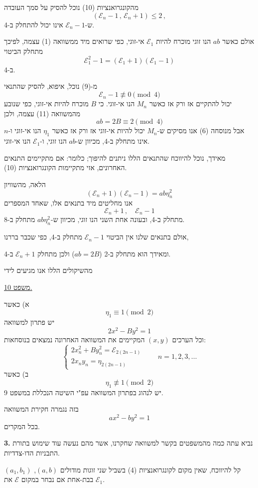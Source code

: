 \medskip
\noindent מהקונגרואנציות (10) נוכל להסיק על סמך העובדה
\[ (\mathcal{E}_n - 1 \, , \, \mathcal{E}_n + 1) \leq 2 \, , \]
ש-$\mathcal{E}_n - 1$ אינו יכול להתחלק ב-4.

\noindent אולם כאשר $ab$ הנו זוגי מוכרח להיות $\mathcal{E}_1$ אי-זוגי, כפי שרואים מיד ממשוואה (1) עצמה, לפיכך מתחלק הביטוי
\[ \mathcal{E}_1^2 - 1 = (\mathcal{E}_1 + 1)(\mathcal{E}_1 - 1) \]
ב-4.

\noindent מ-(9) נוכל, איפוא, להסיק שהתנאי
\[ \mathcal{E}_n - 1 \not\equiv 0 \pmod{4} \]
יכול להתקיים אז ורק אז כאשר $M_n$ הנו אי-זוגי. כי $B$ מוכרח להיות אי-זוגי, כפי שנובע מהמשוואה (11) עצמה, ולכן
\[ ab = 2B \equiv 2 \pmod{4} \]
אבל מנוסחה (6) אנו מסיקים ש-$M_n$ יכול להיות אי-זוגי אז ורק אז כאשר $\eta_1$ הנו אי-זוגי ו-$n$ אינו מתחלק ב-4, מכיוון ש-$ab$ הנו זוגי, ו-$\mathcal{E}_1$ הנו אי-זוגי.

\noindent מאידך, נוכל להיווכח שהתנאים הללו ניתנים להיפוך; כלומר: אם מתקיימים התנאים האחרונים, אזי מתקיימות הקונגרואנציות (10).

\noindent הלאה, מהשוויון
\[ (\mathcal{E}_n + 1)(\mathcal{E}_n - 1) = ab\eta_n^2 \]
אנו מחליטים מיד בתנאים אלו, שאחד המספרים
\[ \mathcal{E}_n + 1 \, , \quad \mathcal{E}_n - 1 \]
מתחלק ב-4, ובעונה אחת השני הנו זוגי, מכיוון ש-$ab\eta_n^2$ מתחלק ב-8.

\noindent אולם בתנאים שלנו אין הביטוי $\mathcal{E}_n - 1$ מתחלק ב-4, כפי שכבר בררנו,

\noindent ומאידך הוא מתחלק ב-2 ($ab = 2B$) ולכן מתחלק $\mathcal{E}_n + 1$ ב-4.

\noindent מהשיקולים הללו אנו מגיעים לידי

\medskip
\noindent\underline{משפט 10.}

\noindent א) כאשר
\[ \eta_1 \equiv 1 \pmod{2} \]
יש פתרון למשוואה
\[ 2x^2 - By^2 = 1 \]
וכל הערכים $(x,y)$ המקיימים את המשוואה האחרונה נמצאים בנוסחאות:
\[ \begin{cases} 2x_n^2 + By_n^2 = \mathcal{E}_{2(2n-1)} \\ 2x_ny_n = \eta_{2(2n-1)} \end{cases} \qquad n = 1 , 2 , 3 , \ldots \tag{12} \]
ב) כאשר
\[ \eta_1 \not\equiv 1 \pmod{2} \]
יש לנהוג בפתרון המשוואה עפ"י השיטה הנכללת במשפט 9.

\medskip
\noindent בזה נגמרה חקירת המשוואה
\[ ax^2 - by^2 = 1 \]
בכל המקרים.

\bigskip
\noindent\textbf{3.} נביא עתה כמה מהמשפטים בקשר למשוואה שחקרנו, אשר מהם נעשה עוד שימוש בתורת התבניות הדו-צדדיות.

\noindent קל להיווכח, שאין מקום לקונגרואנציות (4) בשביל שני זוגות מודולים $(a,b)$, $(a_1,b_1)$ בבת-אחת אם נבחר במקום $\mathcal{E}$ את $\mathcal{E}_1$.

